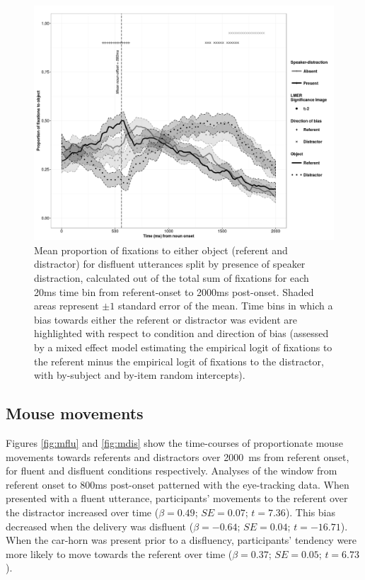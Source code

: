 \documentclass[a4paper,man,natbib]{apa6}
\newcommand*{\SE}{\mathit{SE}} %
\begin{document}
\begin{figure}[Ht] %
  \centering
	\includegraphics[scale=.5]{disfluent.png}
  \caption{Mean proportion of fixations to either object (referent and distractor) for disfluent utterances split by presence of speaker distraction, calculated out of the total sum of fixations for each 20ms time bin from referent-onset to 2000ms post-onset. Shaded areas represent $\pm 1$ standard error of the mean. Time bins in which a bias towards either the referent or distractor was evident are highlighted with respect to condition and direction of bias (assessed by a mixed effect model estimating the empirical logit of fixations to the referent minus the empirical logit of fixations to the distractor, with by-subject and by-item random intercepts).}
  \label{fig:diseye}
\end{figure}

\subsection{Mouse movements}
Figures \ref{fig:mflu} and \ref{fig:mdis} show the time-courses of proportionate mouse movements towards referents and distractors over 2000~ms from referent onset, for fluent and disfluent conditions respectively. 
Analyses of the window from referent onset to 800ms post-onset patterned with the eye-tracking data. 
When presented with a fluent utterance, participants' movements to the referent over the distractor increased over time ($\beta = 0.49$; $\SE = 0.07$; $t=7.36$). 
This bias decreased when the delivery was disfluent ($\beta = -0.64$; $\SE = 0.04$; $t=-16.71$). 
When the car-horn was present prior to a disfluency, participants' tendency were more likely to move towards the referent over time ($\beta = 0.37$; $\SE = 0.05$; $t=6.73$). 
\end{document}
